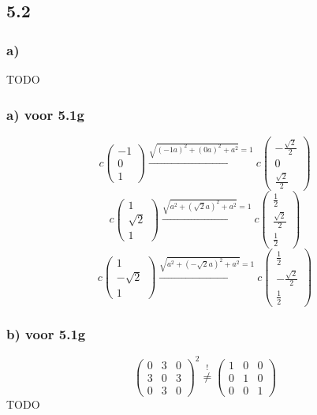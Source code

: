 \documentclass[11pt]{article}
\begin{document}
\subsection*{5.2}
\subsubsection*{a)}
TODO
\subsubsection*{a) voor 5.1g}
\[
c
\begin{pmatrix}
-1\\0\\1
\end{pmatrix}
 \overset{
 \sqrt{(-1a)^2 + (0a)^2 + a^2} = 1}{\rightarrow} 
 c
\begin{pmatrix}
-\frac{\sqrt{2}}{2}\\0\\\frac{\sqrt{2}}{2}
\end{pmatrix}
\]
\[
c
\begin{pmatrix}
1\\\sqrt{2}\\1
\end{pmatrix}
 \overset{
 \sqrt{a^2 + (\sqrt{2}a)^2 + a^2} = 1}{\rightarrow} 
 c
\begin{pmatrix}
\frac{1}{2}\\\frac{\sqrt{2}}{2}\\\frac{1}{2}
\end{pmatrix}
\]
\[
c
\begin{pmatrix}
1\\-\sqrt{2}\\1
\end{pmatrix}
 \overset{
 \sqrt{a^2 + (-\sqrt{2}a)^2 + a^2} = 1}{\rightarrow} 
 c
\begin{pmatrix}
\frac{1}{2}\\-\frac{\sqrt{2}}{2}\\\frac{1}{2}
\end{pmatrix}
\]
\subsubsection*{b) voor 5.1g}
\[
\begin{pmatrix}
0 & 3 & 0 \\
3 & 0 & 3 \\
0 & 3 & 0
\end{pmatrix}^2
 \overset{!}{\neq} 
 \begin{pmatrix}
1 & 0 & 0 \\
0 & 1 & 0 \\
0 & 0 & 1
\end{pmatrix}
\]
TODO
\end{document}
